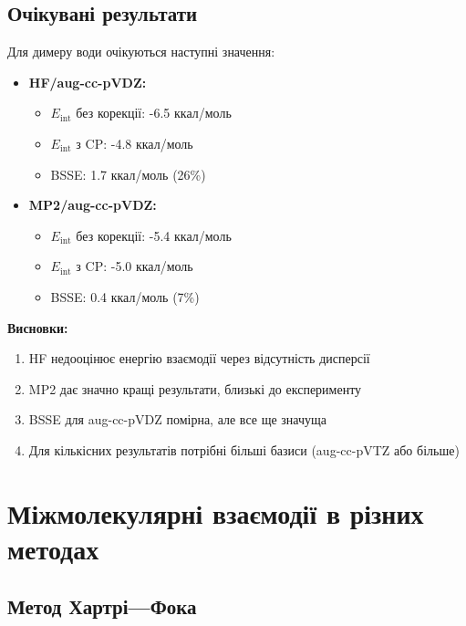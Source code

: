 \subsection{Очікувані результати}

Для димеру води очікуються наступні значення:

\begin{itemize}
    \item \textbf{HF/aug-cc-pVDZ:}
    \begin{itemize}
        \item \(E_{\text{int}}\) без корекції: -6.5 ккал/моль
        \item \(E_{\text{int}}\) з CP: -4.8 ккал/моль
        \item BSSE: 1.7 ккал/моль (26\%)
    \end{itemize}

    \item \textbf{MP2/aug-cc-pVDZ:}
    \begin{itemize}
        \item \(E_{\text{int}}\) без корекції: -5.4 ккал/моль
        \item \(E_{\text{int}}\) з CP: -5.0 ккал/моль
        \item BSSE: 0.4 ккал/моль (7\%)
    \end{itemize}
\end{itemize}

\textbf{Висновки:}
\begin{enumerate}
    \item HF недооцінює енергію взаємодії через відсутність дисперсії
    \item MP2 дає значно кращі результати, близькі до експерименту
    \item BSSE для aug-cc-pVDZ помірна, але все ще значуща
    \item Для кількісних результатів потрібні більші базиси (aug-cc-pVTZ або більше)
\end{enumerate}

\section{Міжмолекулярні взаємодії в різних методах}

\subsection{Метод Хартрі---Фока}

